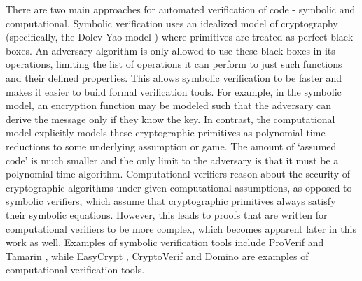 There are two main approaches for automated verification of code - symbolic and computational. Symbolic verification uses an idealized model of cryptography (specifically, the Dolev-Yao model \cite{dolev-yao}) where primitives are treated as perfect black boxes. An adversary algorithm is only allowed to use these black boxes in its operations, limiting the list of operations it can perform to just such functions and their defined properties. This allows symbolic verification to be faster and makes it easier to build formal verification tools. For example, in the symbolic model, an encryption function may be modeled such that the adversary can derive the message only if they know the key. In contrast, the computational model explicitly models these cryptographic primitives as polynomial-time reductions to some underlying assumption or game. The amount of `assumed code' is much smaller and the only limit to the adversary is that it must be a polynomial-time algorithm. Computational verifiers reason about the security of cryptographic algorithms under given computational assumptions, as opposed to symbolic verifiers, which assume that cryptographic primitives always satisfy their symbolic equations. However, this leads to proofs that are written for computational verifiers to be more complex, which becomes apparent later in this work as well. Examples of symbolic verification tools include ProVerif \cite{proverif} and Tamarin \cite{tamarin}, while EasyCrypt \cite{easycrypt}, CryptoVerif \cite{cryptoverif} and Domino \cite{domino:code} are examples of computational verification tools. 

